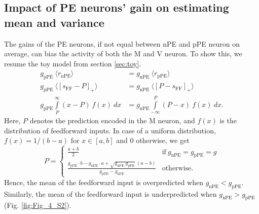 \documentclass[10pt,a4paper,draft]{article}
\begin{document}
\subsection{Impact of PE neurons' gain on estimating mean and variance}\label{sec:impact_gain}\label{sec:gain_impact}
%
The gains of the PE neurons, if not equal between nPE and pPE neuron on average, can bias the activity of both the M and V neuron. To show this, we resume the toy model from section \ref{sec:toy}. 
%
\begin{align}
\label{eq:condition_mean_gain_equal}
g_\mathrm{pPE}\ \langle r_\mathrm{nPE}\rangle &= g_\mathrm{nPE}\ \langle r_\mathrm{pPE}\rangle \\
g_\mathrm{pPE}\ \langle \left[ s_\mathrm{FF}-P\right]_+\rangle &= g_\mathrm{nPE}\ \langle \left[ P-s_\mathrm{FF}\right]_+\rangle \nonumber\\
g_\mathrm{pPE} \int\limits_P^{\infty} \left( x-P\right)\ f(x)\ dx &= g_\mathrm{nPE} \int\limits_{-\infty}^P \left( P-x\right)\ f(x)\ dx. \nonumber
\end{align}
%
Here, $P$ denotes the prediction encoded in the M neuron, and $f(x)$ is the distribution of feedforward inputs. In case of a uniform distribution, $f(x) = 1/(b-a)$ for $x\in [a,b]$ and $0$ otherwise, we get
%
\begin{equation}
\label{eq:prediction_gain}
    P=
    \begin{cases}
      \frac{a + b}{2} & \text{if}\ g_\mathrm{nPE} = g_\mathrm{pPE} = g \\
      \frac{g_\mathrm{pPE}\cdot b - g_\mathrm{nPE}\cdot a + \sqrt{g_\mathrm{nPE}\ g_\mathrm{pPE}}\ (a-b)}{g_\mathrm{pPE} - g_\mathrm{nPE}} & \text{otherwise.}
    \end{cases}
\end{equation}
%
Hence, the mean of the feedforward input is overpredicted when $g_\mathrm{nPE} < g_\mathrm{pPE}$. Similarly, the mean of the feedforward input is underpredicted when $g_\mathrm{nPE} > g_\mathrm{pPE}$ (Fig. \ref{fig:Fig_4_S2}).
\end{document}
